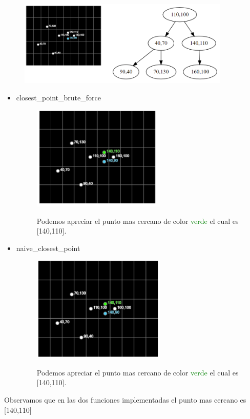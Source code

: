 \begin{figure}[H]
 \centering
 \includegraphics[width=0.9\textwidth]{images/prueba1.PNG}
 \label{fig:act-5-prueba1}
\end{figure}
\begin{itemize}
    \item closest\_point\_brute\_force
    \begin{figure}[H]
     \centering
     \includegraphics[width=0.6\textwidth]{images/prueba1_brute_force.PNG}
     \label{fig:act-5-1}
     \caption{Podemos apreciar el punto mas cercano de color \textcolor{green}{verde} el cual es [140,110].}
    \end{figure}
    \item naive\_closest\_point
    \begin{figure}[H]
     \centering
     \includegraphics[width=0.6\textwidth]{images/prueba1_naive.PNG}
     \label{fig:act-5-2}
     \caption{Podemos apreciar el punto mas cercano de color \textcolor{green}{verde} el cual es [140,110].}
    \end{figure}
\end{itemize}
Observamos que en las dos funciones implementadas el punto mas cercano es [140,110]
